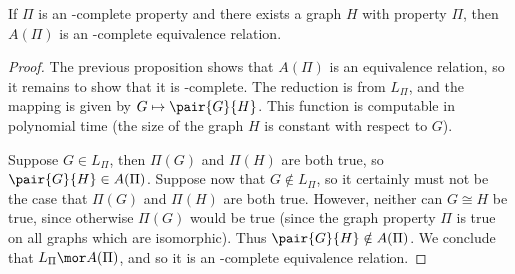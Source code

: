 \begin{theorem}
  If $\Pi$ is an \NP-complete property and there exists a graph $H$ with property $\Pi$, then $A(\Pi)$ is an \NP-complete equivalence relation.
\end{theorem}
\begin{proof}
  The previous proposition shows that $A(\Pi)$ is an equivalence relation, so it remains to show that it is \NP-complete.
  The reduction is from $L_\Pi$, and the mapping is given by $G\mapsto\pair{G}{H}$.
  This function is computable in polynomial time (the size of the graph $H$ is constant with respect to $G$).

  Suppose $G\in L_\Pi$, then $\Pi(G)$ and $\Pi(H)$ are both true, so $\pair{G}{H}\in A(\Pi)$.
  Suppose now that $G\notin L_\Pi$, so it certainly must not be the case that $\Pi(G)$ and $\Pi(H)$ are both true.
  However, neither can $G\cong H$ be true, since otherwise $\Pi(G)$ would be true (since the graph property $\Pi$ is true on all graphs which are isomorphic).
  Thus $\pair{G}{H}\notin A(\Pi)$.
  We conclude that $L_\Pi\mor A(\Pi)$, and so it is an \NP-complete equivalence relation.
\end{proof}
